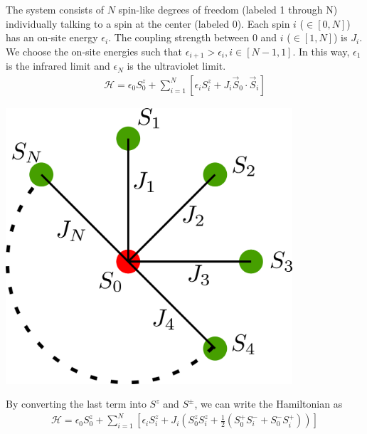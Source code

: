 \noindent
\begin{minipage}{0.5\textwidth}
The system consists of \(N\) spin-like degrees of freedom (labeled 1 through N) individually talking to a spin at the center (labeled 0). Each spin \(i\) (\(\in \left[0,N\right]\)) has an on-site energy \(\epsilon_i\). The coupling strength between 0 and \(i\) (\(\in \left[1,N\right]\)) is \(J_i\). We choose the on-site energies such that \(\epsilon_{i+1} > \epsilon_i, i\in\left[N-1,1\right]\). In this way, \(\epsilon_1\) is the infrared limit and \(\epsilon_N\) is the ultraviolet limit.
\begin{equation}\begin{aligned}
	\mathcal{H} = \epsilon_0 S^z_0 + \sum_{i=1}^N\left[\epsilon_i S^z_i + J_i \vec{S}_0 \cdot \vec{S}_i\right]
\end{aligned}\end{equation}
\end{minipage}
\hfill
\begin{minipage}{0.4\textwidth}
\begin{center}
\includegraphics[width=0.8\textwidth]{../figures/stargraph_.png}
\end{center}
\end{minipage}

By converting the last term into \(S^z\) and \(S^\pm\), we can write the Hamiltonian as
\begin{equation}\begin{aligned}
	\mathcal{H} = \epsilon_0 S^z_0 + \sum_{i=1}^N\left[\epsilon_i S^z_i + J_i\left(S^z_0 S^z_i + \frac{1}{2}\left(S_0^+ S^-_i + S_0^- S^+_i\right)\right)\right]
\end{aligned}\end{equation}

